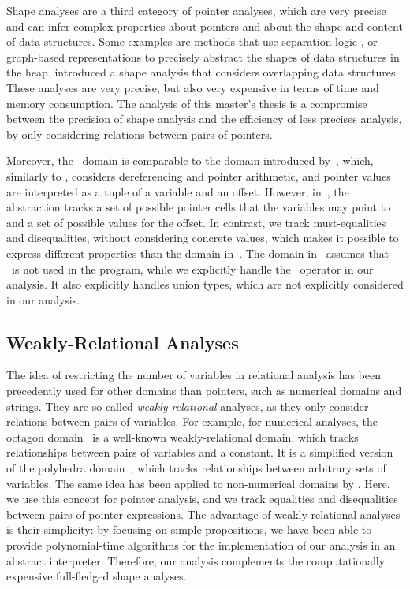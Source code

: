 Shape analyses are a third category of pointer analyses, which are very precise and can infer complex properties about pointers and about the shape and content of data structures.
Some examples are methods that use separation logic \cite{separationlogic,rivalpapers},
or graph-based representations \cite{predator} to precisely abstract the shapes of data structures in the heap.
\textcite{kreiker} introduced a shape analysis that considers overlapping data structures.
These analyses are very precise, but also very expensive in terms of time and memory consumption.
The analysis of this master's thesis is a compromise between the precision of shape analysis and
the efficiency of less precises analysis, by only considering relations between pairs of pointers.

Moreover, the \cpo\ domain is comparable to the domain introduced by~\textcite{Mine06}, which, similarly to \cpo, considers dereferencing and pointer arithmetic, and pointer values are interpreted as a tuple of a variable and an offset.
However, in~\cite{Mine06}, the abstraction tracks
a set of possible pointer cells that the variables may point to and a set of possible values for the offset.
In contrast, we track must-equalities and disequalities, without considering concrete values,
which makes it possible to express different properties than the domain in~\cite{Mine06}.
The domain in~\cite{Mine06} assumes that \malloc\ is not used in the program,
while we explicitly handle the \malloc\ operator in our analysis.
It also explicitly handles union types, which are not explicitly considered in our analysis.

\subsection{Weakly-Relational Analyses}

The idea of restricting the number of variables in relational analysis has been precedently used
for other domains than pointers, such as numerical domains and strings.
They are so-called \emph{weakly-relational} analyses, as they only consider relations between pairs of variables.
For example, for numerical analyses, the octagon domain~\cite{octagon} is a well-known weakly-relational domain,
which tracks relationships between pairs of variables and a constant.
It is a simplified version of the polyhedra domain~\cite{polyhedra}, which tracks relationships between arbitrary sets of variables.
The same idea has been applied to non-numerical domains by \textcite{SeidlETS2023}.
Here, we use this concept for pointer analysis, and we track equalities and disequalities between pairs of pointer expressions.
The advantage of weakly-relational analyses is their simplicity:
by focusing on simple propositions, we have been able to provide polynomial-time algorithms for the implementation of our analysis in an abstract interpreter.
Therefore, our analysis complements the computationally expensive full-fledged shape analyses.
